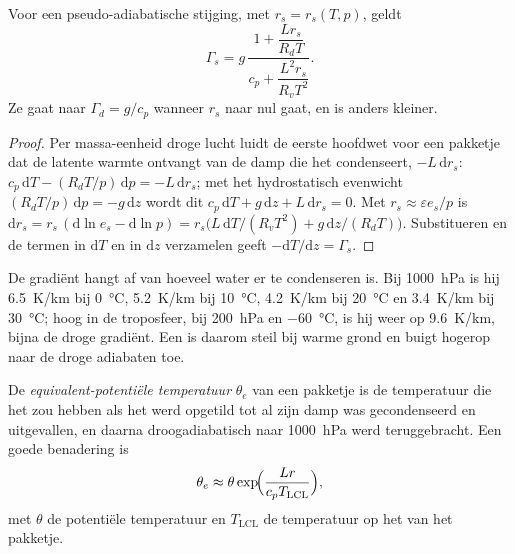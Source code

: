 \begin{proposition}\label{prop:b2:atmospheric-thermodynamics:gamma-s}
Voor een pseudo-adiabatische stijging, met $r_s = r_s(T, p)$, geldt
\[
  \Gamma_s = g\,\frac{1 + \dfrac{L r_s}{R_d T}}{c_p + \dfrac{L^2 r_s}{R_v T^2}} .
\]
Ze gaat naar $\Gamma_d = g/c_p$ wanneer $r_s$ naar nul gaat, en is anders kleiner.
\end{proposition}

\begin{proof}
Per massa-eenheid droge lucht luidt de eerste hoofdwet voor een pakketje dat de latente warmte ontvangt van de damp
die het condenseert, $-L\,\mathrm{d}r_s$: $c_p\,\mathrm{d}T - (R_dT/p)\,\mathrm{d}p = -L\,
\mathrm{d}r_s$; met het hydrostatisch evenwicht $(R_dT/p)\,\mathrm{d}p = -g\,\mathrm{d}z$ wordt dit
$c_p\,\mathrm{d}T + g\,\mathrm{d}z + L\,\mathrm{d}r_s = 0$. Met $r_s \approx \varepsilon e_s/p$ is
$\mathrm{d}r_s = r_s\,(\mathrm{d}\ln e_s - \mathrm{d}\ln p) = r_s\bigl(L\,\mathrm{d}T/(R_vT^2) +
g\,\mathrm{d}z/(R_dT)\bigr)$. Substitueren en de termen in $\mathrm{d}T$ en in
$\mathrm{d}z$ verzamelen geeft $-\mathrm{d}T/\mathrm{d}z = \Gamma_s$.
\end{proof}

De gradiënt hangt af van hoeveel water er te condenseren is. Bij \qty{1000}{hPa} is hij
\qty{6.5}{K/km} bij \qty{0}{\celsius}, \qty{5.2}{K/km} bij \qty{10}{\celsius}, \qty{4.2}{K/km} bij
\qty{20}{\celsius} en \qty{3.4}{K/km} bij \qty{30}{\celsius}; hoog in de troposfeer, bij
\qty{200}{hPa} en \qty{-60}{\celsius}, is hij weer op \qty{9.6}{K/km}, bijna de droge gradiënt. Een
 is daarom steil bij warme grond en buigt hogerop naar de droge adiabaten toe.

\begin{definition}\label{def:b2:atmospheric-thermodynamics:theta-e}
De \emph{equivalent-potentiële temperatuur} $\theta_e$ van
een pakketje is de temperatuur die het zou hebben als het werd opgetild tot al zijn damp was gecondenseerd
en uitgevallen, en daarna droogadiabatisch naar \qty{1000}{hPa} werd teruggebracht. Een goede benadering is
\[
  \theta_e \approx \theta \exp\!\Bigl(\frac{L r}{c_p T_{\text{LCL}}}\Bigr),
\]
met $\theta$ de potentiële temperatuur en $T_{\text{LCL}}$ de temperatuur op het
 van het pakketje.
\end{definition}

